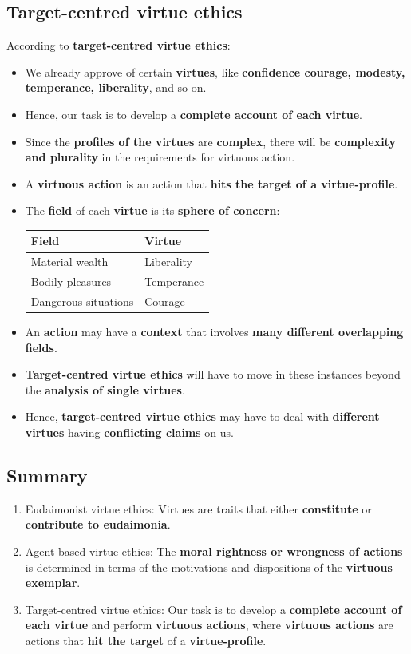 \documentclass[11pt]{article}
\begin{document}
\subsection{Target-centred virtue ethics}
\label{sec:orgee4cd74}
According to \textbf{target-centred virtue ethics}:
\begin{itemize}
\item We already approve of certain \textbf{virtues}, like \textbf{confidence courage, modesty, temperance, liberality}, and so on.
\item Hence, our task is to develop a \textbf{complete account of each virtue}.
\item Since the \textbf{profiles of the virtues} are \textbf{complex}, there will be \textbf{complexity and plurality} in the requirements for virtuous action.
\item A \textbf{virtuous action} is an action that \textbf{hits the target of a virtue-profile}.
\item The \textbf{field} of each \textbf{virtue} is its \textbf{sphere of concern}:
\begin{center}
\begin{tabularx}{\textwidth}{X|X}
Field & Virtue\\
\hline
Material wealth & Liberality\\
Bodily pleasures & Temperance\\
Dangerous situations & Courage\\
\end{tabularx}
\end{center}
\item An \textbf{action} may have a \textbf{context} that involves \textbf{many different overlapping fields}.
\item \textbf{Target-centred virtue ethics} will have to move in these instances beyond the \textbf{analysis of single virtues}.
\item Hence, \textbf{target-centred virtue ethics} may have to deal with \textbf{different virtues} having \textbf{conflicting claims} on us.
\end{itemize}
\subsection{Summary}
\label{sec:org1d107a5}
\begin{enumerate}
\item Eudaimonist virtue ethics:
Virtues are traits that either \textbf{constitute} or \textbf{contribute to eudaimonia}.
\item Agent-based virtue ethics:
The \textbf{moral rightness or wrongness of actions} is determined in terms of the motivations and dispositions of the \textbf{virtuous exemplar}.
\item Target-centred virtue ethics:
Our task is to develop a \textbf{complete account of each virtue} and perform \textbf{virtuous actions}, where \textbf{virtuous actions} are actions that \textbf{hit the target} of a \textbf{virtue-profile}.
\end{enumerate}
\end{document}
